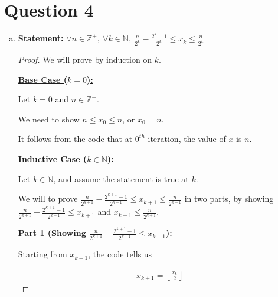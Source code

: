 \documentclass[12pt]{article}
\begin{document}
\section*{Question 4}
\begin{enumerate}[a.]
    \item

    \textbf{Statement:} $\forall n \in \mathbb{Z}^{+},\:\forall k \in \mathbb{N},
    \:\frac{n}{2^k} - \frac{2^k - 1}{2^k} \leq x_k \leq \frac{n}{2^k}$

    \begin{proof}
        We will prove by induction on $k$.

        \bigskip

        \underline{\textbf{Base Case ($k = 0$):}}

        \bigskip

        Let $k = 0$ and $n \in \mathbb{Z}^{+}$.

        \bigskip

        We need to show $n \leq x_0 \leq n$, or $x_0 = n$.

        \bigskip

        It follows from the code that at $0^{th}$ iteration, the value of $x$
        is $n$.

        \bigskip

        \underline{\textbf{Inductive Case ($k \in \mathbb{N}$):}}

        \bigskip

        Let $k \in \mathbb{N}$, and assume the statement is true at $k$.

        \bigskip

        We will to prove $\frac{n}{2^{k+1}} - \frac{2^{k+1}-1}{2^{k+1}} \leq
        x_{k+1} \leq \frac{n}{2^{k+1}}$ in two parts, by showing $\frac{n}{2^{k+1}} -
        \frac{2^{k+1}-1}{2^{k+1}} \leq x_{k+1}$ and $x_{k+1} \leq \frac{n}{2^{k+1}}$.

        \bigskip

        \textbf{Part 1 (Showing $\frac{n}{2^{k+1}} - \frac{2^{k+1}-1}{2^{k+1}} \leq x_{k+1}$):}

        \bigskip

        Starting from $x_{k+1}$, the code tells us

        \setcounter{equation}{0}
        \begin{align}
            x_{k+1} = \left\lfloor \frac{x_k}{2} \right\rfloor
        \end{align}


\end{proof}
\end{enumerate}
\end{document}
